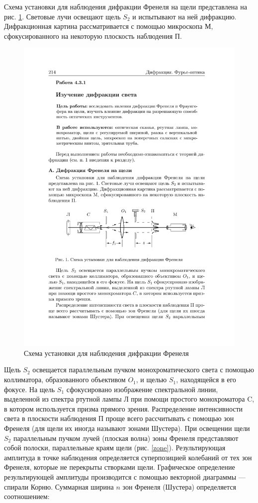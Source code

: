 \documentclass[a4paper,12pt]{article} %
\begin{document}
Схема установки для наблюдения дифракции Френеля на щели представлена на рис. \ref{labA}. Световые лучи освещают щель $ S_2 $ и испытывают на ней дифракцию. Дифракционная картина рассматривается с помощью микроскопа М, сфокусированного на некоторую плоскость наблюдения П.

\begin{figure}[h!]
	\centering
	\includegraphics[width=0.8\linewidth]{a.pdf}
	\caption{Схема установки для наблюдения дифракции Френеля}
	\label{labA}
\end{figure}

Щель $ S_2 $ освещается параллельным пучком монохроматического света с помощью коллиматора, образованного объективом $ O_1 $, и щелью $S_1$, находящейся в его фокусе. На щель $ S_1 $ сфокусировано изображение спектральной линии, выделенной из спектра ртутной лампы Л при помощи простого монохроматора C, в котором используется призма прямого зрения. Распределение интенсивности света в плоскости наблюдения П проще всего рассчитывать с помощью зон Френеля (для щели их иногда называют зонами Шустера). При освещении щели $ S_2 $ параллельным пучком лучей (плоская волна) зоны Френеля представляют собой полоски, параллельные краям щели (рис. \ref{zone}). Результирующая амплитуда в точке наблюдения определяется суперпозицией колебаний от тех зон Френеля, которые не перекрыты створками щели. Графическое определение результирующей амплитуды производится с помощью векторной диаграммы --- спирали Корню. Суммарная ширина $ n $ зон Френеля (Шустера) определяется соотношением:
\end{document}
